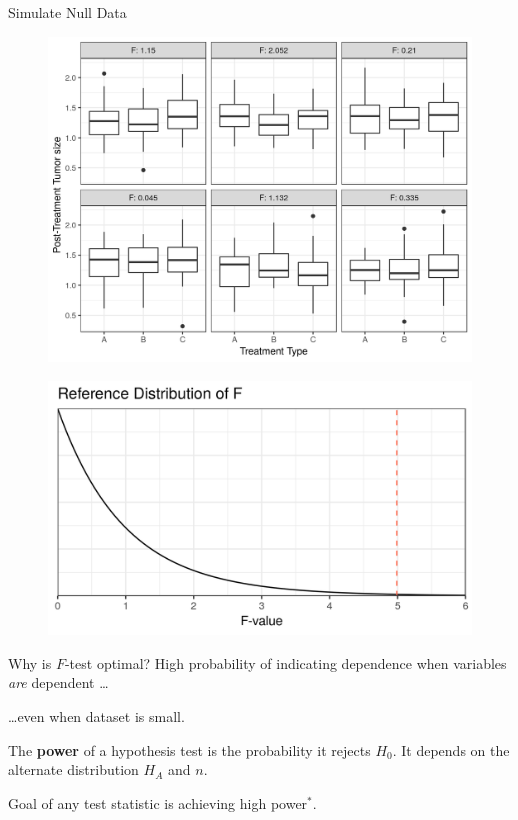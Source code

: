 \documentclass{beamer}
\begin{document}
\begin{frame}{Simulate Null Data}
\begin{figure}
  \includegraphics[scale=0.60]{simulation/null-plots}
\end{figure}
\end{frame}

\begin{frame}{}
\begin{figure}
  \includegraphics[scale=0.9]{simulation/null-dist}
\end{figure} 
\end{frame}

\begin{frame}{Why is $F$-test optimal?}
\pause
High probability of indicating dependence when variables \emph{are} dependent \ldots\pause  

\bigskip
\ldots even when dataset is small.

\pause
\begin{definition}[Power]
The \textbf{power} of a hypothesis test is the probability it rejects $H_0$.  It depends on the alternate distribution $H_A$ and $n$.
\end{definition}
\bigskip 

\pause
Goal of any test statistic is achieving high power$^*$.
\end{frame}
\end{document}
